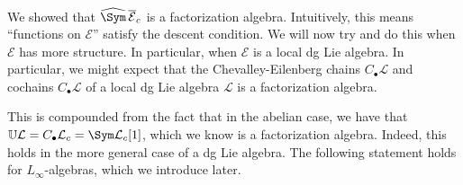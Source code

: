 We showed that $\widehat{\Sym }\, \overline{\mathcal{E} } _c$ is a factorization algebra. Intuitively, this means ``functions on $\mathcal{E} $'' satisfy the descent condition. We will now try and do this when $\mathcal{E} $ has more structure. In particular, when $\mathcal{E} $ is a local dg Lie algebra. In particular, we might expect that the Chevalley-Eilenberg chains $C_{\bullet} \mathcal{L} $ and cochains $C_{\bullet} \mathcal{L} $ of a local dg Lie algebra $\mathcal{L} $ is a factorization algebra.

This is compounded from the fact that in the abelian case, we have that $\mathbb{U} \mathcal{L} =C_{\bullet} \mathcal{L}_c =\Sym \mathcal{L}_c[1]$, which we know is a factorization algebra. Indeed, this holds in the more general case of a dg Lie algebra. The following statement holds for $L_\infty $-algebras, which we introduce later.

